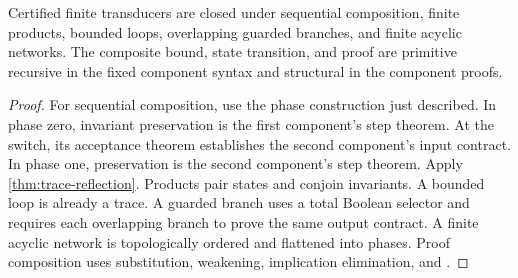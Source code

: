 \begin{theorem}
\label{thm:transducer-closure}
Certified finite transducers are closed under sequential composition, finite
products, bounded loops, overlapping guarded branches, and finite acyclic
networks.  The composite bound, state transition, and proof are primitive
recursive in the fixed component syntax and structural in the component
proofs.
\end{theorem}

\begin{proof}
For sequential composition, use the phase construction just described.  In
phase zero, invariant preservation is the first component's step theorem.  At
the switch, its acceptance theorem establishes the second component's input
contract.  In phase one, preservation is the second component's step theorem.
Apply \cref{thm:trace-reflection}.  Products pair states and conjoin invariants.
A bounded loop is already a trace.  A guarded branch uses a total Boolean
selector and requires each overlapping branch to prove the same output
contract.  A finite acyclic network is topologically ordered and flattened
into phases.  Proof composition uses substitution, weakening, implication
elimination, and .
\end{proof}
